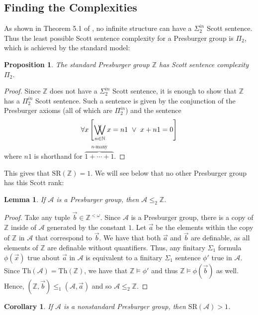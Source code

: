 \documentclass{amsart}%
\numberwithin{theorem}{section}
\newtheorem{corollary}[theorem]{Corollary}
\newtheorem{lemma}[theorem]{Lemma}
\newtheorem{proposition}[theorem]{Proposition}
\newcommand{\Th}{\text{Th}}
\newcommand{\Z}{\mathbb{Z}}
\newcommand{\N}{\mathbb{N}}
\newcommand{\A}{\mathcal{A}}
\newcommand{\0}{\emptyset}
\DeclareMathOperator*{\VV}{\bigvee\mkern-12mu\bigvee}
\newcommand{\lom}{^{< \omega}}
\newcommand{\SR}{\text{SR}}
\begin{document}
\subsection{Finding the Complexities}

As shown in Theorem 5.1 of \cite{Alvir-et}, no infinite structure can have a $\Sigma_2^{in}$ Scott sentence. Thus the least possible Scott sentence complexity for a Presburger group is $\Pi_2$, which is achieved by the standard model:

\begin{proposition}
    The standard Presburger group $\Z$ has Scott sentence complexity $\Pi_2$. 
\end{proposition}

\begin{proof}
    Since $\Z$ does not have a $\Sigma^{in}_2$ Scott sentence, it is enough to show that $\Z$ has a $\Pi^{in}_2$ Scott sentence. Such a sentence is given by the conjunction of the Presburger axioms (all of which are $\Pi^{in}_2$) and the sentence $$ \forall x \left[\VV_{n\in \N} x= n1~\vee ~ x+n1=0 \right]$$ where $n1$ is shorthand for $\overbrace{1+\cdots +1}^{n\text{-many}} $.     \end{proof} 
This gives that $\SR(\Z)=1$. We will see below that no other Presburger group has this Scott rank:

\begin{lemma}
\label{lemma A<2Z}
    If $\A$ is a Presburger group, then $\A\leq_2 \Z$.
\end{lemma}

\begin{proof}
    Take  any tuple $\vec b\in \Z\lom$. Since $\A$ is a Presburger group, there is a copy of $\Z$ inside of $\A$ generated by the constant $1$. Let $\vec a$ be the elements within the copy of $\Z$ in $\A$ that correspond to $\vec b$. We have that both $\vec a$ and $\vec b$ are definable, as all elements of $\Z$ are definable without quantifiers. Thus, any finitary $\Sigma_1$ formula $\phi(\vec x)$ true about $\vec a$ in $\A$ is equivalent to a finitary $\Sigma_1$ sentence $\phi'$ true in $\A$. Since $\Th(\A)=\Th(\Z)$, we have that $\Z\models \phi'$ and thus  $\Z\models\phi(\vec b)$ as well. Hence, $(\Z, \vec b)\leq_1 (\A,\vec a)$ and so $\A\leq_2 \Z$. 
\end{proof}


\begin{corollary}
\label{non standard SR>1}
    If $\A$ is a nonstandard Presburger group, then $\SR(\A)>1$. 
\end{corollary}
\end{document}
